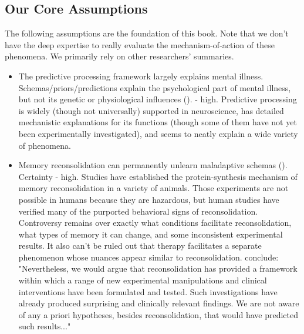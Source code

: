 \documentclass[12pt,letterpaper]{book}
\begin{document}
\subsection*{Our Core Assumptions}
The following assumptions are the foundation of this book. Note that we don't have the deep expertise to really evaluate the mechanism-of-action of these phenomena. We primarily rely on other researchers' summaries.
\begin{itemize}
	\item The predictive processing framework largely explains mental illness. Schemas/priors/predictions explain the psychological part of mental illness, but not its genetic or physiological influences (\textcite{aizenbud2025neuralmechanismspredictiveprocessing,clark2015surfing,Clark_Watson_Friston_2018,eckerUnlocking,laneReconsolidation}). - high. Predictive processing is widely (though not universally) supported in neuroscience, has detailed mechanistic explanations for its functions (though some of them have not yet been experimentally investigated), and seems to neatly explain a wide variety of phenomena.
	\item Memory reconsolidation can permanently unlearn maladaptive schemas (\textcite{eckerUnlocking,laneReconsolidation,elsey2018human}). Certainty - high. Studies have established the protein-synthesis mechanism of memory reconsolidation in a variety of animals. Those experiments are not possible in humans because they are hazardous, but human studies have verified many of the purported behavioral signs of reconsolidation. Controversy remains over exactly what conditions facilitate reconsolidation, what types of memory it can change, and some inconsistent experimental results. It also can't be ruled out that therapy facilitates a separate phenomenon whose nuances appear similar to reconsolidation. \textcite{elsey2018human} conclude: "Nevertheless, we would argue that reconsolidation has provided a framework within which a range of new experimental manipulations and clinical interventions have been formulated and tested. Such investigations have already produced surprising and clinically relevant findings. We are not aware of any a priori hypotheses, besides reconsolidation, that would have predicted such results..."

\end{itemize}
\end{document}
